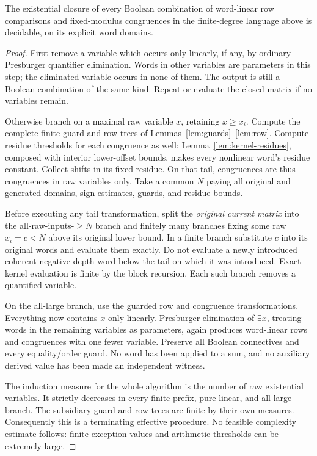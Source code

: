 \documentclass[11pt]{article}
\begin{document}
\begin{theorem}\label{thm:existential}
The existential closure of every Boolean combination of word-linear row
comparisons and fixed-modulus congruences in the finite-degree language
above is decidable, on its explicit word domains.
\end{theorem}
\begin{proof}
First remove a variable which occurs only linearly, if any, by ordinary
Presburger quantifier elimination. Words in other variables are parameters
in this step; the eliminated variable occurs in none of them. The output
is still a Boolean combination of the same kind. Repeat or evaluate the
closed matrix if no variables remain.

Otherwise branch on a maximal raw variable $x$, retaining $x\ge x_i$.
Compute the complete finite guard and row trees of
Lemmas~\ref{lem:guards}--\ref{lem:row}. Compute residue thresholds for each
congruence as well: Lemma~\ref{lem:kernel-residues}, composed with interior
lower-offset bounds, makes every nonlinear word's residue constant.
Collect shifts in its fixed residue. On that tail, congruences are thus
congruences in raw variables only. Take a common $N$ paying all original
and generated domains, sign estimates, guards, and residue bounds.

Before executing any tail transformation, split the \emph{original current
matrix} into the all-raw-inputs-$\ge N$ branch and finitely many branches
fixing some raw $x_i=c<N$ above its original lower bound. In a finite
branch substitute $c$ into its original words and evaluate them exactly.
Do not evaluate a newly introduced coherent negative-depth word below the
tail on which it was introduced. Exact kernel evaluation is finite by the
block recursion. Each such branch removes a quantified variable.

On the all-large branch, use the guarded row and congruence transformations.
Everything now contains $x$ only linearly. Presburger elimination of
$\exists x$, treating words in the remaining variables as parameters,
again produces word-linear rows and congruences with one fewer variable.
Preserve all Boolean connectives and every equality/order guard. No word
has been applied to a sum, and no auxiliary derived value has been made
an independent witness.

The induction measure for the whole algorithm is the number of raw
existential variables. It strictly decreases in every finite-prefix,
pure-linear, and all-large branch. The subsidiary guard and row trees are
finite by their own measures. Consequently this is a terminating effective
procedure. No feasible complexity estimate follows: finite exception values
and arithmetic thresholds can be extremely large.
\end{proof}
\end{document}
